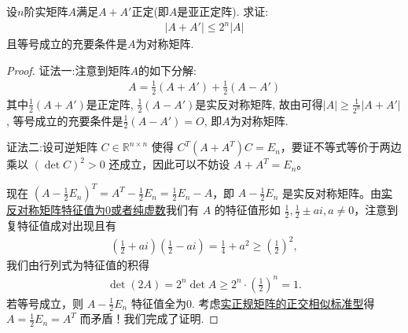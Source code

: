 \documentclass[../../main.tex]{subfiles}
\begin{document}
\begin{proposition}\label{proposition:例9.115}
设\( n \)阶实矩阵\( A \)满足\( A+A' \)正定(即\( A \)是亚正定阵). 求证:
\begin{align*}
|A+A'| \leqslant 2^n|A|
\end{align*}
且等号成立的充要条件是\( A \)为对称矩阵.
\end{proposition}
\begin{proof}
{\color{blue}证法一:}注意到矩阵\( A \)的如下分解:
\begin{align*}
A = \frac{1}{2}(A+A') + \frac{1}{2}(A-A')
\end{align*}
其中\( \frac{1}{2}(A+A') \)是正定阵, \( \frac{1}{2}(A-A') \)是实反对称矩阵, 故由可得\( |A| \geqslant \frac{1}{2^n}|A+A'| \), 等号成立的充要条件是\( \frac{1}{2}(A-A') = O \), 即\( A \)为对称矩阵.

{\color{blue}证法二:}设可逆矩阵 \( C \in \mathbb{R}^{n \times n} \) 使得 \( C^T (A + A^T) C = E_n \)，要证不等式等价于两边乘以 \( (\det C)^2 > 0 \) 还成立，因此可以不妨设 \( A + A^T = E_n \)。

现在 \( (A - \frac{1}{2}E_n)^T = A^T - \frac{1}{2}E_n = \frac{1}{2}E_n - A \)，即 \( A - \frac{1}{2}E_n \) 是实反对称矩阵。由\hyperref[proposition:实对称(反称)阵的特征值]{实反对称矩阵特征值为0或者纯虚数}我们有 \( A \) 的特征值形如 \( \frac{1}{2}, \frac{1}{2} \pm ai, a \neq 0 \)，注意到复特征值成对出现且有
\begin{align*}
\left( \frac{1}{2} + ai \right) \left( \frac{1}{2} - ai \right) = \frac{1}{4} + a^2 \geqslant \left( \frac{1}{2} \right)^2,
\end{align*}
我们由行列式为特征值的积得
\begin{align*}
\det (2A) = 2^n \det A \geqslant 2^n \cdot \left( \frac{1}{2} \right)^n = 1.
\end{align*}
若等号成立，则 \( A - \frac{1}{2}E_n \) 特征值全为0. 考虑\hyperref[theorem:实正规矩阵的正交相似标准型]{实正规矩阵的正交相似标准型}得 \( A = \frac{1}{2}E_n = A^T \) 而矛盾！我们完成了证明.

\end{proof}
\end{document}
